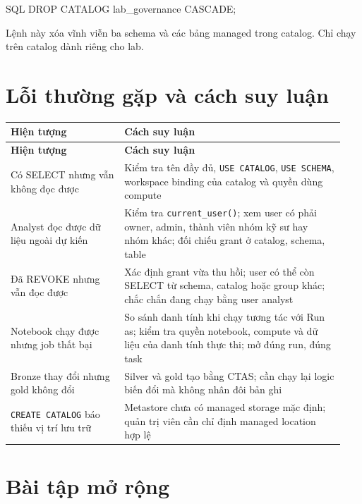 \begin{aivncodebox}[language={}]{SQL}
DROP CATALOG lab_governance CASCADE;
\end{aivncodebox}

Lệnh này xóa vĩnh viễn ba schema và các bảng managed trong catalog. Chỉ chạy trên catalog dành riêng cho lab.


\section{Lỗi thường gặp và cách suy luận}

\begingroup\small
\renewcommand{\arraystretch}{1.2}
\begin{longtable}{@{}p{0.32\linewidth}p{0.62\linewidth}@{}}
\toprule
\rowcolor{rowLavender}
\textbf{Hiện tượng} & \textbf{Cách suy luận} \\
\midrule
\endfirsthead
\toprule
\rowcolor{rowLavender}
\textbf{Hiện tượng} & \textbf{Cách suy luận} \\
\midrule
\endhead
\bottomrule
\endfoot
Có SELECT nhưng vẫn không đọc được & Kiểm tra tên đầy đủ, \texttt{USE CATALOG}, \texttt{USE SCHEMA}, workspace binding của catalog và quyền dùng compute \\
Analyst đọc được dữ liệu ngoài dự kiến & Kiểm tra \texttt{current\_\allowbreak{}user()}; xem user có phải owner, admin, thành viên nhóm kỹ sư hay nhóm khác; đối chiếu grant ở catalog, schema, table \\
Đã REVOKE nhưng vẫn đọc được & Xác định grant vừa thu hồi; user có thể còn SELECT từ schema, catalog hoặc group khác; chắc chắn đang chạy bằng user analyst \\
Notebook chạy được nhưng job thất bại & So sánh danh tính khi chạy tương tác với Run as; kiểm tra quyền notebook, compute và dữ liệu của danh tính thực thi; mở đúng run, đúng task \\
Bronze thay đổi nhưng gold không đổi & Silver và gold tạo bằng CTAS; cần chạy lại logic biến đổi mà không nhân đôi bản ghi \\
\texttt{CREATE CATALOG} báo thiếu vị trí lưu trữ & Metastore chưa có managed storage mặc định; quản trị viên cần chỉ định managed location hợp lệ \\
\end{longtable}
\endgroup

\section{Bài tập mở rộng}

